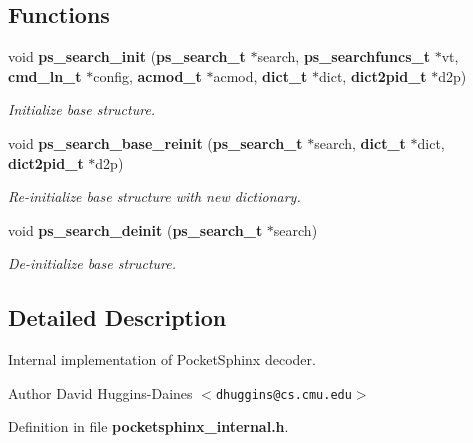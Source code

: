 \subsection*{\-Functions}
\begin{DoxyCompactItemize}
\item 
void {\bf ps\-\_\-search\-\_\-init} ({\bf ps\-\_\-search\-\_\-t} $\ast$search, {\bf ps\-\_\-searchfuncs\-\_\-t} $\ast$vt, {\bf cmd\-\_\-ln\-\_\-t} $\ast$config, {\bf acmod\-\_\-t} $\ast$acmod, {\bf dict\-\_\-t} $\ast$dict, {\bf dict2pid\-\_\-t} $\ast$d2p)\label{pocketsphinx__internal_8h_ad848d8d0cf0398542bfb74a2e34dbff3}

\begin{DoxyCompactList}\small\item\em \-Initialize base structure. \end{DoxyCompactList}\item 
void {\bf ps\-\_\-search\-\_\-base\-\_\-reinit} ({\bf ps\-\_\-search\-\_\-t} $\ast$search, {\bf dict\-\_\-t} $\ast$dict, {\bf dict2pid\-\_\-t} $\ast$d2p)\label{pocketsphinx__internal_8h_a307801961f27bd5f4b82a3e6b83e0ca1}

\begin{DoxyCompactList}\small\item\em \-Re-\/initialize base structure with new dictionary. \end{DoxyCompactList}\item 
void {\bf ps\-\_\-search\-\_\-deinit} ({\bf ps\-\_\-search\-\_\-t} $\ast$search)\label{pocketsphinx__internal_8h_a1299496b3498166928702d0701934e50}

\begin{DoxyCompactList}\small\item\em \-De-\/initialize base structure. \end{DoxyCompactList}\end{DoxyCompactItemize}


\subsection{\-Detailed \-Description}
\-Internal implementation of \-Pocket\-Sphinx decoder. \begin{DoxyAuthor}{\-Author}
\-David \-Huggins-\/\-Daines $<${\tt dhuggins@cs.\-cmu.\-edu}$>$ 
\end{DoxyAuthor}


\-Definition in file {\bf pocketsphinx\-\_\-internal.\-h}.

